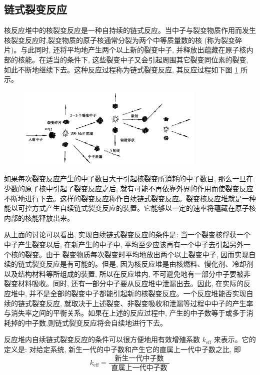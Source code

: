 \documentclass{Sichuan Normal University}
\begin{document}
\subsection{链式裂变反应}

核反应堆中的核裂变反应是一种自持续的链式反应。当中子与裂变物质作用而发生核裂变反应时,裂变物质的原子核通常分裂为两个中等质量数的核 (称为裂变碎片)。与此同时, 还将平均地产生两个以上新的裂变中子, 并释放出蕴藏在原子核内部的核能。在适当的条件下, 这些裂变中子又会引起周围其它裂变同位素的裂变, 如此不断地继续下去。这种反应过程称为链式裂变反应, 其反应过程如下图 \ref{fig:链式裂变反应} 所示。
\begin{figure}[H]
    \centering
    \includegraphics[width=0.8\textwidth]{./figure/链式裂变反应示意图.png}
    \label{fig:链式裂变反应}
    \end{figure}
如果每次裂变反应产生的中子数目大于引起核裂变所消耗的中子数目, 那么一旦在少数的原子核中引起了裂变反应之后, 就有可能不再依靠外界的作用而使裂变反应不断地进行下去。这样的裂变反应称作自续链式裂变反应。裂变核反应堆就是一种能以可控方式产生自续链式裂变反应的装置。它能够以一定的速率将蕴藏在原子核内部的核能释放出来。

从上面的讨论可以看出, 实现自续链式裂变反应的条件是: 当一个裂变核俘获一个中子产生裂变以后, 在新产生的中子中, 平均至少应该再有一个中子去引起另外一个核的裂变。由于
裂变物质每次裂变时平均地放出两个以上裂变中子, 因而实现自续的链式裂变反应是有可能的。但是, 因为核反应堆是由核燃料、慢化剂、冷却剂以及结构材料等所组成的装置, 所以在反应堆内, 不可避免地有一部分中子要被非裂变材料吸收。同时, 还有一部分中子要从反应堆中泄漏出去。因此, 在实际的反应堆中, 并不是全部的裂变中子都能引起新的核裂变反应。一个反应堆能否实现自续的链式裂变反应, 就取决于上述裂变、非裂变吸收和泄漏等过程中中子的产生率与消失率之间的平衡关系。如果在上述的反应过程中, 产生的中子数等于或多于消耗掉的中子数,则链式裂变反应将会自续地进行下去。

反应堆内自续链式裂变反应的条件可以很方便地用有效增殖系数 $k_{\mathrm{eff}}$ 来表示。它的定义是: 对给定系统, 新生一代的中子数和产生它的直属上一代中子数之比, 即
\begin{equation}
    k_{\mathrm{eff}}=\frac{\text { 新生一代中子数 }}{\text { 直属上一代中子数 }}
    \label{eq:有效增殖系数}
\end{equation}
\end{document}
